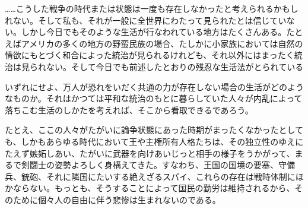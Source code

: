




……こうした戦争の時代または状態は一度も存在しなかったと考えられるかもしれない。そして私も、それが一般に全世界にわたって見られたとは信じていない。しかし今日でもそのような生活が行なわれている地方はたくさんある。たとえばアメリカの多くの地方の野蛮民族の場合、たしかに小家族においては自然の情欲にもとづく和合によった統治が見られるけれども、それ以外にはまったく統治は見られない。そして今日でも前述したとおりの残忍な生活法がとられている

いずれにせよ、万人が恐れをいだく共通の力が存在しない場合の生活がどのようなものか。それはかつては平和な統治のもとに暮らしていた人々が内乱によって落ちこむ生活のしかたを考えれば、そこから看取できるであろう。

たとえ、ここの人々がたがいに論争状態にあった時期がまったくなかったとしても、しかもあらゆる時代において王や主権所有人格たちは、その独立性のゆえにたえず嫉妬しあい、たがいに武器を向けあいじっと相手の様子をうかがって、まるで剣闘士の姿勢よろしく身構えてきた。すなわち、王国の国境の要塞、守備兵、銃砲、それに隣国にたいする絶えざるスパイ、これらの存在は戦時体制にほかならない。もっとも、そうすることによって国民の勤労は維持されるから、そのために個々人の自由に伴う悲惨は生まれないのである。


